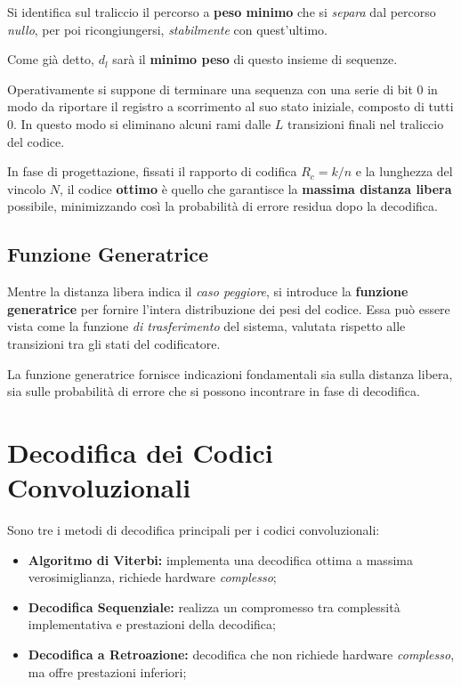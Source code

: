 Si identifica sul traliccio il percorso a \textbf{peso minimo} che si \textit{separa} dal percorso \textit{nullo}, per poi ricongiungersi, \textit{stabilmente} con quest'ultimo.

Come già detto, $d_l$ sarà il \textbf{minimo peso} di questo insieme di sequenze.

Operativamente si suppone di terminare una sequenza con una serie di bit $0$ in modo da riportare il registro a scorrimento al suo stato iniziale, composto di tutti $0$. In questo modo si eliminano alcuni rami dalle $L$ transizioni finali nel traliccio del codice.

In fase di progettazione, fissati il rapporto di codifica $R_c = k/n$ e la lunghezza del vincolo $N$, il codice \textbf{ottimo} è quello che garantisce la \textbf{massima distanza libera} possibile, minimizzando così la probabilità di errore residua dopo la decodifica.


\subsection{Funzione Generatrice}
Mentre la distanza libera indica il \textit{caso peggiore}, si introduce la \textbf{funzione generatrice} per fornire l'intera distribuzione dei pesi del codice. Essa può essere vista come la funzione \textit{di trasferimento} del sistema, valutata rispetto alle transizioni tra gli stati del codificatore.

La funzione generatrice fornisce indicazioni fondamentali sia sulla distanza libera, sia sulle probabilità di errore che si possono incontrare in fase di decodifica.

\section{Decodifica dei Codici Convoluzionali} 
Sono tre i metodi di decodifica principali per i codici convoluzionali:
\begin{itemize}
    \item \textbf{Algoritmo di Viterbi:} implementa una decodifica ottima a massima verosimiglianza, richiede hardware \textit{complesso};

    \item \textbf{Decodifica Sequenziale:} realizza un compromesso tra complessità implementativa e prestazioni della decodifica;

    \item \textbf{Decodifica a Retroazione:} decodifica che non richiede hardware \textit{complesso}, ma offre prestazioni inferiori;
\end{itemize}


